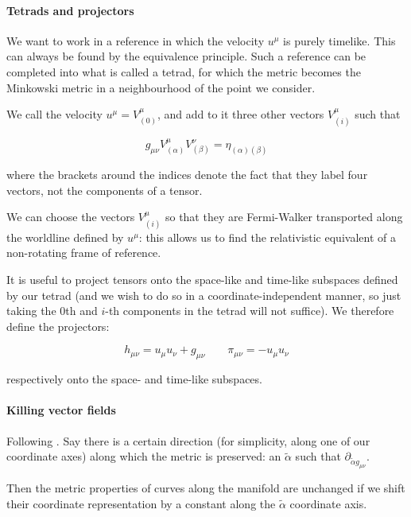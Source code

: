\documentclass[main.tex]{subfiles}
\begin{document}
\paragraph{Tetrads and projectors} \label{par:tetrads}

We want to work in a reference in which the velocity $u^\mu$ is purely timelike. This can always be found by the equivalence principle. Such a reference can be completed into what  is called a tetrad, for which the metric becomes the Minkowski metric in a neighbourhood of the point we consider.

We call the velocity \(u^\mu = V^\mu _{(0)}\), and add to it three other vectors \(V^\mu_{(i)}\) such that

\begin{equation}
    g_{\mu\nu} V^\mu _{(\alpha)} V^\nu _{(\beta)} = \eta_{(\alpha) (\beta)}
\end{equation}

where the brackets around the indices denote the fact that they label four vectors, not the components of a tensor.

We can choose the vectors \(V_{(i)}^\mu\) so that they are Fermi-Walker transported along the worldline defined by \(u^\mu\): this allows us to find the relativistic equivalent of a non-rotating frame of reference.

It is useful to project tensors onto the space-like and time-like subspaces defined by our tetrad (and we wish to do so in a coordinate-independent manner,  so just taking the 0th and $i $-th components in the tetrad will not suffice). We therefore define the projectors:

\begin{equation}
    h_{\mu \nu} = u_\mu u_\nu + g_{\mu \nu} \qquad \pi_{\mu\nu} = -u_\mu u_\nu
\end{equation}

respectively onto the space- and time-like subspaces.

\paragraph{Killing vector fields}

Following \cite[section 25.2, page 650]{MisnerThorneWheeler:1973}.
Say there is a certain direction (for simplicity, along one of our coordinate axes) along which the metric is preserved: an \(\widetilde{\alpha}\) such that \(\partial_{\widetilde{\alpha} g_{\mu\nu}}\).

Then the metric properties of curves along the manifold are unchanged if we shift their coordinate representation by a constant along the \(\widetilde{\alpha}\) coordinate axis.
\end{document}
